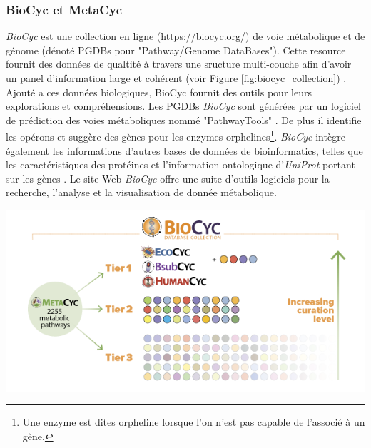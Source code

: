 \begin{refsegment}
    \subsubsection{BioCyc et MetaCyc}
    
    \textit{BioCyc} \cite{caspi2006metacyc,caspi2007metacyc,caspi2008metacyc,caspi2010metacyc,caspi2012metacyc,caspi2013metacyc,caspi2014metacyc,caspi2015metacyc,caspi2016metacyc} est une collection en ligne (\url{https://biocyc.org/}) de voie métabolique et de génome (dénoté PGDBs pour "Pathway/Genome DataBases"). Cette resource fournit des données de qualtité à travers une sructure multi-couche afin d'avoir un panel d'information large et cohérent (voir Figure \ref{fig:biocyc_collection}) . Ajouté a ces données biologiques, BioCyc fournit des outils pour leurs explorations et compréhensions. Les PGDBs \textit{BioCyc} sont générées par un logiciel de prédiction des voies métaboliques nommé "PathwayTools" \cite{karpe2011pathway,karp2015pathway}. De plus il identifie les opérons \cite{romero2004using} et suggère des gènes pour les enzymes orphelines\footnote{Une enzyme est dites orpheline lorsque l'on n'est pas capable de l'associé à un gène.}\cite{Green2004}. \textit{BioCyc} intègre également les informations d'autres bases de données de bioinformatics, telles que les caractéristiques des protéines et l'information ontologique d'\textit{UniProt} portant sur les gènes . Le site Web \textit{BioCyc} offre une suite d'outils logiciels pour la recherche, l'analyse et la visualisation de donnée métabolique.
    
    
    \begin{shadedfigure}
    	\centering
    	\includegraphics[width=\textwidth]{img/BioCycCollection.png}
    	\caption{\textit{BioCyc} est un ensemble de base de donnée et d'outil sur le métabolisme. \textit{Metacyc} regroupe l'ensemble des informations du monde vivant. Cette ressource comprend 2255 voies métaboliques à ce jour. Ces données biologiques sont répartis à travers 3 couches (i.e "Tiers"). Ces couches classifient le niveau de qualité des bases de données  (Du moins vers le plus qualitatif : tiers 3 à 1). \hspace{\textwidth} Source : \url{https://biocyc.org/}    }
    	\label{fig:biocyc_collection}
    \end{shadedfigure}
    

\end{refsegment}
